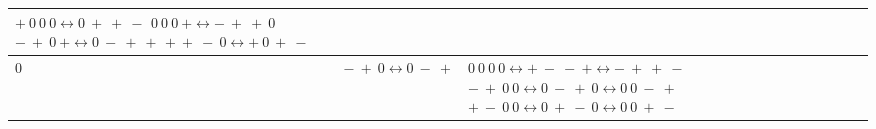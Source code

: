 \begin{table*}[t]
\begin{tabular}{ |P{3cm}||P{4cm}|P{7cm}|  }
{			$+\ 0\ 0\ 0 \leftrightarrow 0\ +\ +\ -$                                                                                                                                                                                                                                                                                                                                                                                                                                                   \\$0\ 0\ 0\ + \leftrightarrow -\ +\ +\ 0$\\
			$-\ +\ 0\ + \leftrightarrow 0\ -\ +\ +$\\
			$+\ +\ -\ 0 \leftrightarrow +\ 0\ +\ -$                                                                                                                                                                                                                                                                                                                                                                                                                                                                                                                                                                                                                                                                                                                                                                                                                                                                                                                                                                                                                                                                                                                                                                                                                                                                                                                                                      }\\
		\hline
		$0$ & $-\ +\ 0 \leftrightarrow 0\ -\ +$ & 
\end{tabular}
\end{table*}
